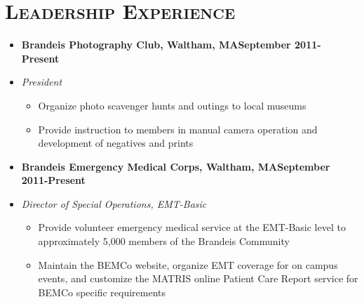 \documentclass[10pt, oneside]{article}
\newcommand{\lr}[2]{#1\hfill#2}
\newenvironment{ressection}[1]{
  \section{\normalsize \scshape \selectfont #1 \normalfont}
  \vspace{-4pt}
  \begin{itemize} \itemsep-2pt
  }{
  \end{itemize}
  \vspace{-20pt}
}
\newenvironment{resitem}[4]{
\item[] \lr{\bfseries \selectfont #1\normalfont, #2} {#3}
\item[] \textsl{#4}
  \vspace{-4pt}
  \begin{itemize} \itemsep-2pt
  }{
  \end{itemize}
}
\begin{document}
\begin{ressection}{Leadership Experience}
  \begin{resitem}{Brandeis Photography Club}{Waltham, MA}{September 2011-Present}{President}
  \item Organize photo scavenger hunts and outings to local museums
  \item Provide instruction to members in manual camera operation and development of negatives and prints
  \end{resitem}
  \begin{resitem}{Brandeis Emergency Medical Corps}{Waltham, MA}{September 2011-Present}{Director of Special Operations, EMT-Basic}
  \item Provide volunteer emergency medical service at the EMT-Basic level to approximately 5,000 members of the Brandeis Community
  \item Maintain the BEMCo website, organize EMT coverage for on campus events, and customize the MATRIS online Patient Care Report service for BEMCo specific requirements
  \end{resitem}
\end{ressection}
\end{document}
